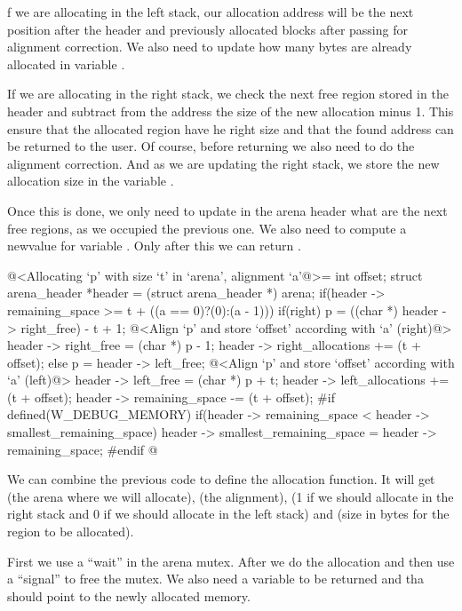 f we are allocating in the left stack, our allocation address will be
the next position after the header and previously allocated blocks
after passing for alignment correction. We also need to update how
many bytes are already allocated in
variable .

If we are allocating in the right stack, we check the next free region
stored in the header and subtract from the address the size of the new
allocation minus 1. This ensure that the allocated region have he
right size and that the found address can be returned to the user. Of
course, before returning we also need to do the alignment
correction. And as we are updating the right stack, we store the new
allocation size in the variable .

Once this is done, we only need to update in the arena header what are
the next free regions, as we occupied the previous one. We also need
to compute a newvalue for variable . Only
after this we can return .

\iniciocodigo
@<Allocating `p' with size `t' in `arena', alignment `a'@>=
{
  int offset;
  struct arena_header *header = (struct arena_header *) arena;
  if(header -> remaining_space >= t + ((a == 0)?(0):(a - 1))){
    if(right){
      p = ((char *) header -> right_free) - t + 1;
      @<Align `p' and store `offset' according with `a' (right)@>
      header -> right_free = (char *) p - 1;
      header -> right_allocations += (t + offset);
    }
    else{
      p = header -> left_free;
      @<Align `p' and store `offset' according with `a' (left)@>
      header -> left_free = (char *) p + t;
      header -> left_allocations += (t + offset);
    }
    header -> remaining_space -= (t + offset);
#if defined(W_DEBUG_MEMORY)
    if(header -> remaining_space < header -> smallest_remaining_space)
      header -> smallest_remaining_space = header -> remaining_space;
#endif
  }
}
@
\fimcodigo


We can combine the previous code to define the allocation function. It
will get  (the arena where we will allocate),
 (the alignment),  (1 if we should
allocate in the right stack and 0 if we should allocate in the left
stack) and  (size in bytes for the region to be
allocated).

First we use a ``wait'' in the arena mutex. After we do the allocation
and then use a ``signal'' to free the mutex. We also need a
variable  to be returned and tha should point to the
newly allocated memory.

